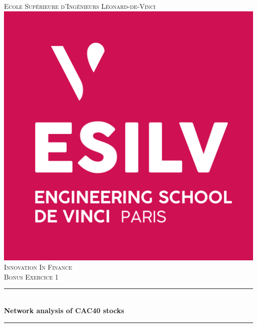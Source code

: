 \documentclass[12pt]{article}
\begin{document}
\begin{titlepage}
\newcommand{\HRule}{\rule{\linewidth}{0.5mm}} %
\center %

\textsc{\LARGE Ecole Supérieure d'Ingénieurs Léonard-de-Vinci}\\[1cm]
\includegraphics[scale=.4]{logo_esilv.png}\\[1cm]
\textsc{\Large Innovation In Finance}\\[0.5cm]
\textsc{\large Bonus Exercice 1}\\[0.5cm]
\HRule \\[0.4cm]
{ \huge \bfseries Network analysis of CAC40 stocks}\\[0.4cm]
\HRule \\[0.5cm]

\end{titlepage}
\end{document}
